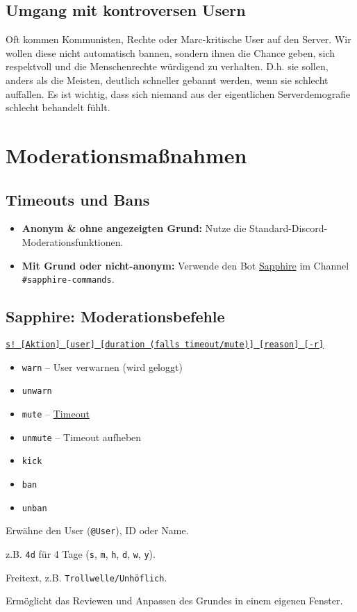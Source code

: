 \documentclass[a4paper,12pt]{article}
\begin{document}
\subsection{Umgang mit kontroversen Usern}
Oft kommen Kommunisten, Rechte oder Marc-kritische User auf den Server. Wir wollen diese nicht automatisch bannen, sondern ihnen die Chance geben, sich
respektvoll und die Menschenrechte würdigend zu verhalten. D.h. sie sollen, anders als die Meisten, deutlich schneller gebannt werden, wenn sie schlecht auffallen.
Es ist wichtig, dass sich niemand aus der eigentlichen Serverdemografie schlecht behandelt fühlt.
\section{Moderationsmaßnahmen}
\label{sec:sapphire}
\hypertarget{sec:sapphire}{}
\subsection{Timeouts und Bans}
\begin{itemize}
    \item \textbf{Anonym \& ohne angezeigten Grund:} Nutze die Standard-Discord-Moderationsfunktionen.
    \item \textbf{Mit Grund oder nicht-anonym:} Verwende den Bot \hyperlink{term:sapphire}{Sapphire} im Channel \texttt{\#sapphire-commands}.
\end{itemize}

\subsection{Sapphire: Moderationsbefehle}
\begin{description}[style=nextline]
    \item[Befehlsschema:] \hyperlink{term:command}{\texttt{s! [Aktion] [user] [duration (falls timeout/mute)] [reason] [-r]}}
    \item[Aktionen:]
    \begin{itemize}
        \item \texttt{warn} -- User verwarnen (wird geloggt)
        \item \texttt{unwarn}
        \item \texttt{mute} -- \hyperlink{term:to}{Timeout}
        \item \texttt{unmute} -- Timeout aufheben
        \item \texttt{kick}
        \item \texttt{ban}
        \item \texttt{unban}
    \end{itemize}
    \item[\texttt{[User]:}] Erwähne den User (\texttt{@User}), ID oder Name.
    \item[\texttt{[Dauer]:}] z.B. \texttt{4d} für 4 Tage (\texttt{s}, \texttt{m}, \texttt{h}, \texttt{d}, \texttt{w}, \texttt{y}).
    \item[\texttt{[Reason]:}] Freitext, z.B. \texttt{Trollwelle/Unhöflich}.
    \item[\texttt{[-r]:}] Ermöglicht das Reviewen und Anpassen des Grundes in einem eigenen Fenster.
\end{description}
\end{document}
